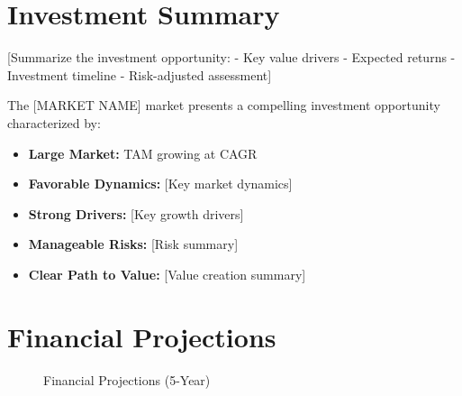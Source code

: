 \documentclass[11pt,letterpaper]{report}
\newcommand{\reporttitle}{[MARKET NAME]}
\begin{document}
\section{Investment Summary}

[Summarize the investment opportunity:
- Key value drivers
- Expected returns
- Investment timeline
- Risk-adjusted assessment]

\begin{executivesummarybox}
The \reporttitle{} market presents a compelling investment opportunity characterized by:

\begin{itemize}
    \item \textbf{Large Market:}  TAM growing at  CAGR
    \item \textbf{Favorable Dynamics:} [Key market dynamics]
    \item \textbf{Strong Drivers:} [Key growth drivers]
    \item \textbf{Manageable Risks:} [Risk summary]
    \item \textbf{Clear Path to Value:} [Value creation summary]
\end{itemize}
\end{executivesummarybox}

\section{Financial Projections}


\begin{figure}[htbp]
\centering
\caption{Financial Projections (5-Year)}
\label{fig:financials}
\end{figure}
\end{document}
